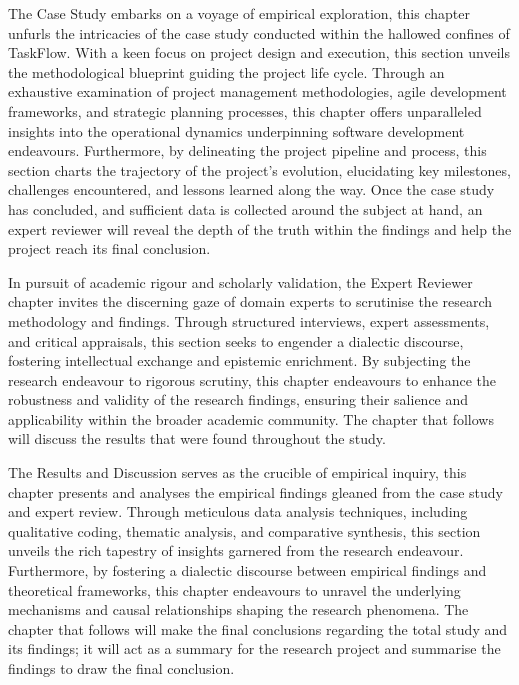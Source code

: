 \par{The Case Study embarks on a voyage of empirical exploration, this chapter unfurls the intricacies of the case study 
conducted within the hallowed confines of TaskFlow. With a keen focus on project design and execution, this section 
unveils the methodological blueprint guiding the project life cycle. Through an exhaustive examination of project 
management methodologies, agile development frameworks, and strategic planning processes, this chapter offers 
unparalleled insights into the operational dynamics underpinning software development endeavours. Furthermore, by 
delineating the project pipeline and process, this section charts the trajectory of the project's evolution, 
elucidating key milestones, challenges encountered, and lessons learned along the way. Once the case study has 
concluded, and sufficient data is collected around the subject at hand, an expert reviewer will reveal the depth of 
the truth within the findings and help the project reach its final conclusion.}
\par{In pursuit of academic rigour and scholarly validation, the Expert Reviewer chapter invites the discerning gaze 
of domain experts to scrutinise the research methodology and findings. Through structured interviews, expert 
assessments, and critical appraisals, this section seeks to engender a dialectic discourse, fostering intellectual 
exchange and epistemic enrichment. By subjecting the research endeavour to rigorous scrutiny, this chapter 
endeavours to enhance the robustness and validity of the research findings, ensuring their salience and applicability 
within the broader academic community. The chapter that follows will discuss the results that were found throughout the study.}
\par{The Results and Discussion serves as the crucible of empirical inquiry, this chapter presents and analyses the 
empirical findings gleaned from the case study and expert review. Through meticulous data analysis techniques, 
including qualitative coding, thematic analysis, and comparative synthesis, this section unveils the rich tapestry of 
insights garnered from the research endeavour. Furthermore, by fostering a dialectic discourse between empirical findings 
and theoretical frameworks, this chapter endeavours to unravel the underlying mechanisms and causal relationships shaping 
the research phenomena. The chapter that follows will make the final conclusions regarding the total study and its 
findings; it will act as a summary for the research project and summarise the findings to draw the final conclusion.}
